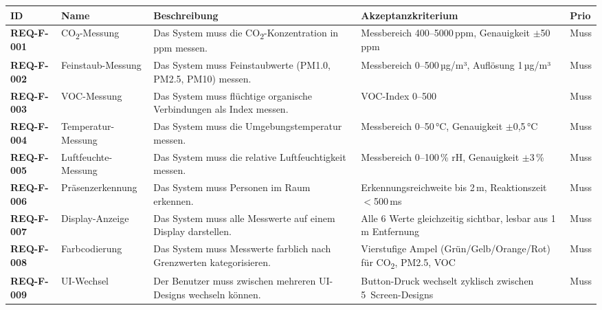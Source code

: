 \documentclass[a4paper,11pt]{article}
\begin{document}
\begin{longtable}{p{1.8cm} p{2.3cm} p{4cm} p{3.5cm} p{1cm}}
\toprule
\rowcolor{tableheader}
\textbf{ID} & \textbf{Name} & \textbf{Beschreibung} & \textbf{Akzeptanzkriterium} & \textbf{Prio} \\
\midrule
\endhead

\textbf{REQ-F-001} & CO\textsubscript{2}-Messung & Das System muss die CO\textsubscript{2}-Konzentration in ppm messen. & Messbereich 400--5000\,ppm, Genauigkeit $\pm$50\,ppm & Muss \\
\midrule

\textbf{REQ-F-002} & Feinstaub-Messung & Das System muss Feinstaubwerte (PM1.0, PM2.5, PM10) messen. & Messbereich 0--500\,µg/m³, Auflösung 1\,µg/m³ & Muss \\
\midrule

\textbf{REQ-F-003} & VOC-Messung & Das System muss flüchtige organische Verbindungen als Index messen. & VOC-Index 0--500 & Muss \\
\midrule

\textbf{REQ-F-004} & Temperatur-Messung & Das System muss die Umgebungstemperatur messen. & Messbereich 0--50\,°C, Genauigkeit $\pm$0,5\,°C & Muss \\
\midrule

\textbf{REQ-F-005} & Luftfeuchte-Messung & Das System muss die relative Luftfeuchtigkeit messen. & Messbereich 0--100\,\% rH, Genauigkeit $\pm$3\,\% & Muss \\
\midrule

\textbf{REQ-F-006} & Präsenzerkennung & Das System muss Personen im Raum erkennen. & Erkennungsreichweite bis 2\,m, Reaktionszeit $<$500\,ms & Muss \\
\midrule

\textbf{REQ-F-007} & Display-Anzeige & Das System muss alle Messwerte auf einem Display darstellen. & Alle 6 Werte gleichzeitig sichtbar, lesbar aus 1\,m Entfernung & Muss \\
\midrule

\textbf{REQ-F-008} & Farbcodierung & Das System muss Messwerte farblich nach Grenzwerten kategorisieren. & Vierstufige Ampel (Grün/Gelb/Orange/Rot) für CO\textsubscript{2}, PM2.5, VOC & Muss \\
\midrule

\textbf{REQ-F-009} & UI-Wechsel & Der Benutzer muss zwischen mehreren UI-Designs wechseln können. & Button-Druck wechselt zyklisch zwischen 5~Screen-Designs & Muss \\
\midrule


\end{longtable}
\end{document}
